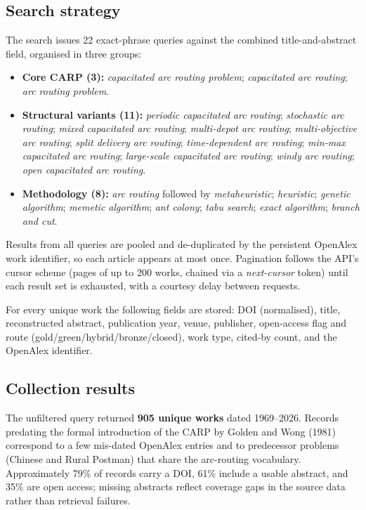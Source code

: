 \documentclass[11pt]{article}
\begin{document}
\subsection{Search strategy}

The search issues 22 exact-phrase queries against the combined title-and-abstract
field, organised in three groups:

\begin{itemize}[nosep]
  \item \textbf{Core CARP (3):} \emph{capacitated arc routing problem};
        \emph{capacitated arc routing}; \emph{arc routing problem}.
  \item \textbf{Structural variants (11):} \emph{periodic capacitated arc routing};
        \emph{stochastic arc routing}; \emph{mixed capacitated arc routing};
        \emph{multi-depot arc routing}; \emph{multi-objective arc routing};
        \emph{split delivery arc routing}; \emph{time-dependent arc routing};
        \emph{min-max capacitated arc routing}; \emph{large-scale capacitated arc
        routing}; \emph{windy arc routing}; \emph{open capacitated arc routing}.
  \item \textbf{Methodology (8):} \emph{arc routing} followed by
        \emph{metaheuristic}; \emph{heuristic}; \emph{genetic algorithm};
        \emph{memetic algorithm}; \emph{ant colony}; \emph{tabu search};
        \emph{exact algorithm}; \emph{branch and cut}.
\end{itemize}

Results from all queries are pooled and de-duplicated by the persistent OpenAlex work
identifier, so each article appears at most once. Pagination follows the API's
cursor scheme (pages of up to 200 works, chained via a \emph{next-cursor} token)
until each result set is exhausted, with a courtesy delay between requests.

For every unique work the following fields are stored: DOI (normalised), title,
reconstructed abstract, publication year, venue, publisher, open-access flag and
route (gold/green/hybrid/bronze/closed), work type, cited-by count, and the OpenAlex
identifier.

\subsection{Collection results}

The unfiltered query returned \textbf{905 unique works} dated 1969--2026. Records
predating the formal introduction of the CARP by Golden and Wong (1981) correspond to
a few mis-dated OpenAlex entries and to predecessor problems (Chinese and Rural
Postman) that share the arc-routing vocabulary. Approximately 79\% of records carry a
DOI, 61\% include a usable abstract, and 35\% are open access; missing abstracts
reflect coverage gaps in the source data rather than retrieval failures.
\end{document}
